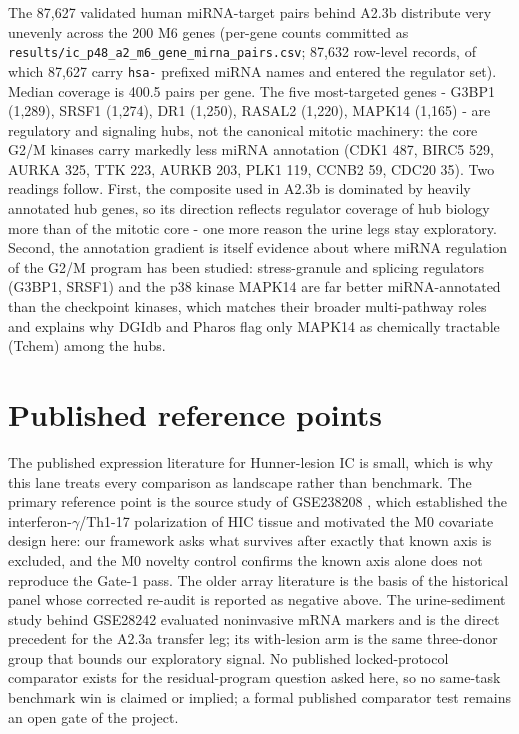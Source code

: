 \documentclass[11pt,a4paper]{article}
\begin{document}
The 87{,}627 validated human miRNA-target pairs behind A2.3b distribute very
unevenly across the 200 M6 genes (per-gene counts committed as
\texttt{results/ic\_p48\_a2\_m6\_gene\_mirna\_pairs.csv}; 87{,}632
row-level records, of which 87{,}627 carry \texttt{hsa-} prefixed miRNA names
and entered the regulator set). Median coverage is 400.5 pairs per gene. The
five most-targeted genes - G3BP1 (1{,}289), SRSF1 (1{,}274), DR1 (1{,}250),
RASAL2 (1{,}220), MAPK14 (1{,}165) - are regulatory and signaling hubs, not the
canonical mitotic machinery: the core G2/M kinases carry markedly less miRNA
annotation (CDK1 487, BIRC5 529, AURKA 325, TTK 223, AURKB 203, PLK1 119,
CCNB2 59, CDC20 35). Two readings follow. First, the composite used in A2.3b
is dominated by heavily annotated hub genes, so its direction reflects
regulator coverage of hub biology more than of the mitotic core - one more
reason the urine legs stay exploratory. Second, the annotation gradient is
itself evidence about where miRNA regulation of the G2/M program has been
studied: stress-granule and splicing regulators (G3BP1, SRSF1) and the p38
kinase MAPK14 are far better miRNA-annotated than the checkpoint kinases, which
matches their broader multi-pathway roles and explains why DGIdb and Pharos
flag only MAPK14 as chemically tractable (Tchem) among the hubs.

\section{Published reference points}
The published expression literature for Hunner-lesion IC is small, which is
why this lane treats every comparison as landscape rather than benchmark. The
primary reference point is the source study of GSE238208 \cite{akiyama2023},
which established the interferon-$\gamma$/Th1-17 polarization of HIC tissue
and motivated the M0 covariate design here: our framework asks what survives
after exactly that known axis is excluded, and the M0 novelty control confirms
the known axis alone does not reproduce the Gate-1 pass. The older array
literature \cite{keay2003,gamo2009,walker2014} is the basis of the historical
panel whose corrected re-audit is reported as negative above. The urine-sediment
study behind GSE28242 \cite{colaco2012} evaluated noninvasive mRNA markers and
is the direct precedent for the A2.3a transfer leg; its with-lesion arm is the
same three-donor group that bounds our exploratory signal. No published
locked-protocol comparator exists for the residual-program question asked here,
so no same-task benchmark win is claimed or implied; a formal published
comparator test remains an open gate of the project.
\end{document}

